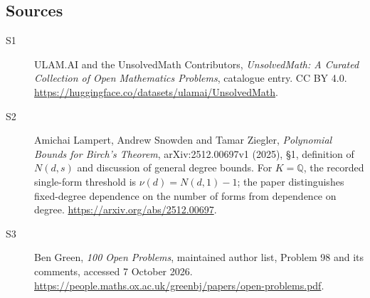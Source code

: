 \documentclass[11pt]{article}
\begin{document}
\subsection{Sources}
\begin{description}
\item[\hypertarget{source:statement:1}{S1}] ULAM.AI and the UnsolvedMath Contributors, \emph{UnsolvedMath: A Curated Collection of Open Mathematics Problems}, catalogue entry. CC BY 4.0. \url{https://huggingface.co/datasets/ulamai/UnsolvedMath}.
\item[\hypertarget{source:statement:2}{S2}] Amichai Lampert, Andrew Snowden and Tamar Ziegler, \emph{Polynomial Bounds for Birch’s Theorem}, arXiv:2512.00697v1 (2025), §1, definition of $N(d,s)$ and discussion of general degree bounds. For $K=\mathbb Q$, the recorded single-form threshold is $\nu(d)=N(d,1)-1$; the paper distinguishes fixed-degree dependence on the number of forms from dependence on degree. \url{https://arxiv.org/abs/2512.00697}.
\item[\hypertarget{source:statement:3}{S3}] Ben Green, \emph{100 Open Problems}, maintained author list, Problem 98 and its comments, accessed 7 October 2026. \url{https://people.maths.ox.ac.uk/greenbj/papers/open-problems.pdf}.
\end{description}
\label{end:statement}
\end{document}
